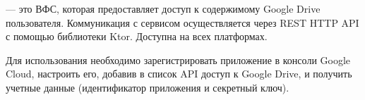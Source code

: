   \subsubsection{}
     --- это ВФС, которая предоставляет доступ к содержимому Google Drive пользователя. Коммуникация с сервисом осуществляется через REST HTTP API с помощью библиотеки Ktor. Доступна на всех платформах.

    Для использования необходимо зарегистрировать приложение в консоли Google Cloud\cite{google-cloud}, настроить его, добавив в список API доступ к Google Drive, и получить учетные данные (идентификатор приложения и секретный ключ).


